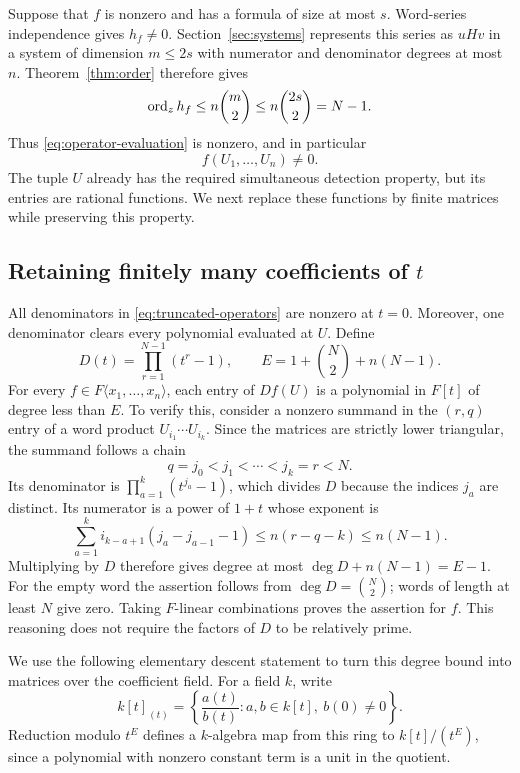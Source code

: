 Suppose that $f$ is nonzero and has a formula of size at most $s$.  Word-series
independence gives $h_f\ne0$.  Section~\ref{sec:systems} represents this series
as $uHv$ in a system of dimension $m\leq2s$ with numerator and denominator
degrees at most $n$.  Theorem~\ref{thm:order} therefore gives
\[
  \operatorname{ord}_z h_f\leq n\binom m2\leq n\binom{2s}{2}=N-1.
\]
Thus \eqref{eq:operator-evaluation} is nonzero, and in particular
\begin{equation}\label{eq:rational-hitting}
 f(U_1,\ldots,U_n)\ne0.
\end{equation}
The tuple $U$ already has the required simultaneous detection property, but its
entries are rational functions.  We next replace these functions by finite
matrices while preserving this property.

\subsection{Retaining finitely many coefficients of \texorpdfstring{$t$}{t}}

All denominators in \eqref{eq:truncated-operators} are nonzero at $t=0$.
Moreover, one denominator clears every polynomial evaluated at $U$.  Define
\begin{equation}\label{eq:t-truncation-length}
 D(t)=\prod_{r=1}^{N-1}(t^r-1),
 \qquad
 E=1+\binom N2+n(N-1).
\end{equation}
For every $f\in F\langle x_1,\ldots,x_n\rangle$, each entry of $Df(U)$ is a
polynomial in $F[t]$ of degree less than $E$.  To verify this, consider a
nonzero summand in the $(r,q)$ entry of a word product
$U_{i_1}\cdots U_{i_k}$.  Since the matrices are strictly lower triangular,
the summand follows a chain
\[
 q=j_0<j_1<\cdots<j_k=r<N.
\]
Its denominator is $\prod_{a=1}^k(t^{j_a}-1)$, which divides $D$ because the
indices $j_a$ are distinct.  Its numerator is a power of $1+t$ whose exponent
is
\[
 \sum_{a=1}^k i_{k-a+1}(j_a-j_{a-1}-1)
 \leq n(r-q-k)\leq n(N-1).
\]
Multiplying by $D$ therefore gives degree at most
$\deg D+n(N-1)=E-1$.  For the empty word the assertion follows from
$\deg D=\binom N2$; words of length at least $N$ give zero.  Taking
$F$-linear combinations proves the assertion for $f$.  This reasoning does
not require the factors of $D$ to be relatively prime.

We use the following elementary descent statement to turn this degree bound
into matrices over the coefficient field.  For a field $k$, write
\[
 k[t]_{(t)}=
 \left\{\frac{a(t)}{b(t)}:a,b\in k[t],\ b(0)\ne0\right\}.
\]
Reduction modulo $t^E$ defines a $k$-algebra map from this ring to
$k[t]/(t^E)$, since a polynomial with nonzero constant term is a unit in the
quotient.

